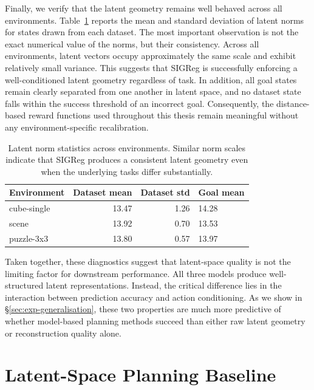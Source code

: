 Finally, we verify that the latent geometry remains well behaved across
all environments. Table~\ref{tab:norms-multienv} reports the mean and
standard deviation of latent norms for states drawn from each dataset.
The most important observation is not the exact numerical value of the
norms, but their consistency. Across all environments, latent vectors
occupy approximately the same scale and exhibit relatively small
variance. This suggests that SIGReg is successfully enforcing a
well-conditioned latent geometry regardless of task.
In addition, all goal states remain clearly separated from one another
in latent space, and no dataset state falls within the success
threshold of an incorrect goal. Consequently, the distance-based reward
functions used throughout this thesis remain meaningful without any
environment-specific recalibration.

\begin{table}[h]
\centering
\caption{Latent norm statistics across environments. Similar norm
scales indicate that SIGReg produces a consistent latent geometry even
when the underlying tasks differ substantially.}
\label{tab:norms-multienv}
\begin{tabular}{lrrl}
\toprule
Environment & Dataset mean & Dataset std & Goal mean \\
\midrule
cube-single & 13.47 & 1.26 & 14.28 \\
scene       & 13.92 & 0.70 & 13.53 \\
puzzle-3x3  & 13.80 & 0.57 & 13.97 \\
\bottomrule
\end{tabular}
\end{table}

Taken together, these diagnostics suggest that latent-space quality is
not the limiting factor for downstream performance. All three models
produce well-structured latent representations. Instead, the critical
difference lies in the interaction between prediction accuracy and
action conditioning. As we show in
\S\ref{sec:exp-generalisation}, these two properties are much more
predictive of whether model-based planning methods succeed than either
raw latent geometry or reconstruction quality alone.

\section{Latent-Space Planning Baseline}
\label{sec:exp-cem-baseline}


